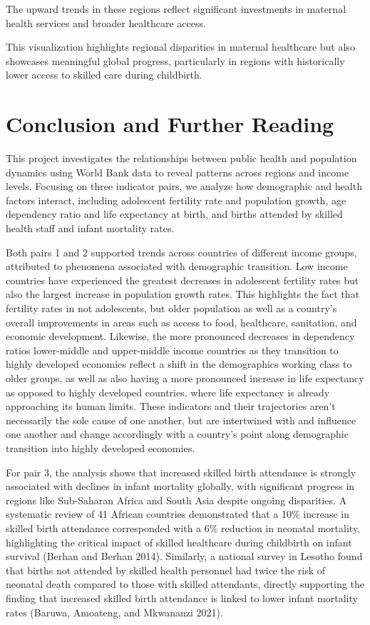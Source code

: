 \documentclass[
  letterpaper,
  DIV=11,
  numbers=noendperiod]{scrartcl}
\begin{document}
The upward trends in these regions reflect significant investments in
maternal health services and broader healthcare access.

This visualization highlights regional disparities in maternal
healthcare but also showcases meaningful global progress, particularly
in regions with historically lower access to skilled care during
childbirth.

\section{Conclusion and Further
Reading}\label{conclusion-and-further-reading}

This project investigates the relationships between public health and
population dynamics using World Bank data to reveal patterns across
regions and income levels. Focusing on three indicator pairs, we analyze
how demographic and health factors interact, including adolescent
fertility rate and population growth, age dependency ratio and life
expectancy at birth, and births attended by skilled health staff and
infant mortality rates.

Both pairs 1 and 2 supported trends across countries of different income
groups, attributed to phenomena associated with demographic transition.
Low income countries have experienced the greatest decreases in
adolescent fertility rates but also the largest increase in population
growth rates. This highlights the fact that fertility rates in not
adolescents, but older population as well as a country's overall
improvements in areas such as access to food, healthcare, sanitation,
and economic development. Likewise, the more pronounced decreases in
dependency ratios lower-middle and upper-middle income countries as they
transition to highly developed economies reflect a shift in the
demographics working class to older groups, as well as also having a
more pronounced increase in life expectancy as opposed to highly
developed countries, where life expectancy is already approaching its
human limits. These indicators and their trajectories aren't necessarily
the sole cause of one another, but are intertwined with and influence
one another and change accordingly with a country's point along
demographic transition into highly developed economies.

For pair 3, the analysis shows that increased skilled birth attendance
is strongly associated with declines in infant mortality globally, with
significant progress in regions like Sub-Saharan Africa and South Asia
despite ongoing disparities. A systematic review of 41 African countries
demonstrated that a 10\% increase in skilled birth attendance
corresponded with a 6\% reduction in neonatal mortality, highlighting
the critical impact of skilled healthcare during childbirth on infant
survival (Berhan and Berhan 2014). Similarly, a national survey in
Lesotho found that births not attended by skilled health personnel had
twice the risk of neonatal death compared to those with skilled
attendants, directly supporting the finding that increased skilled birth
attendance is linked to lower infant mortality rates (Baruwa, Amoateng,
and Mkwananzi 2021).
\end{document}
